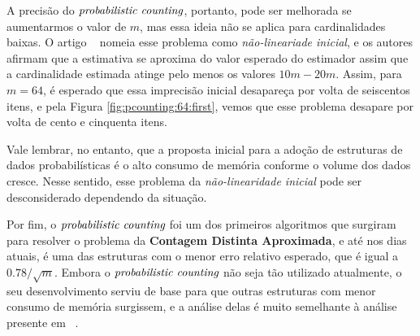 A precisão do $\textit{probabilistic counting}$, portanto, pode ser melhorada se aumentarmos o valor de $m$, mas essa ideia não se aplica 
para cardinalidades baixas. O artigo ~\citep{flajolet:martin:85} nomeia esse problema como 
\textit{não-lineariade inicial}, e os autores afirmam que a estimativa se aproxima do valor esperado do estimador assim 
que a cardinalidade estimada atinge pelo menos os valores $10m{-}20m$. Assim, para $m = 64$, é esperado que essa 
imprecisão inicial desapareça por volta de seiscentos itens, e pela Figura \ref{fig:pcounting:64:first}, vemos que esse 
problema desapare por volta de cento e cinquenta itens.

Vale lembrar, no entanto, que a proposta inicial para a adoção de estruturas de dados probabilísticas é o alto consumo 
de memória conforme o volume dos dados cresce. Nesse sentido, esse problema da \textit{não-linearidade inicial} pode ser 
desconsiderado dependendo da situação. 

Por fim, o $\textit{probabilistic counting}$ foi um dos primeiros algoritmos que surgiram para resolver o problema da 
\textbf{Contagem Distinta Aproximada}, e até nos dias atuais, é uma das estruturas com o menor erro relativo esperado, 
que é igual a $0.78 / \sqrt{m}$. Embora o $\textit{probabilistic counting}$ não seja tão utilizado atualmente, o seu desenvolvimento serviu 
de base para que outras estruturas com menor consumo de memória surgissem, e a análise delas é muito semelhante à 
análise presente em ~\citep{flajolet:martin:85}. 